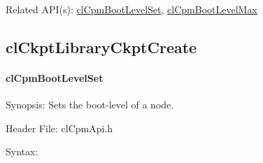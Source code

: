 {\begin{Desc}
\item[Related API(s):]\hyperlink{group__group14}{cl\-Cpm\-Boot\-Level\-Set}, \hyperlink{group__group14}{cl\-Cpm\-Boot\-Level\-Max} \end{Desc}
\newpage




\subsection{clCkptLibraryCkptCreate}
\hypertarget{pagecpm106}{}\paragraph{cl\-Cpm\-Boot\-Level\-Set}\label{pagecpm106}
\begin{Desc}
\item[Synopsis:]Sets the boot-level of a node.\end{Desc}
\begin{Desc}
\item[Header File:]clCpmApi.h\end{Desc}
\begin{Desc}
\item[Syntax:]


\end{Desc}}
